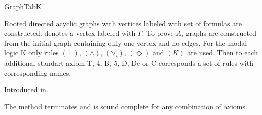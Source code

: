 \begin{entry}{GraphTabK}
\begin{clarifications}
  Rooted directed acyclic graphs with vertices labeled with set of formulas are constructed.
   denotes a vertex labeled with $\Gamma$.
  To prove $A$, graphs are constructed from the initial graph containing only one vertex
   and no edges.
  For the modal logic K only rules $(\bot)$, $(\mathord\wedge)$, $(\mathord\vee_i)$, $(\Diamond)$ and
  $(K)$ are used.
  Then to each additional standart axiom T, 4, B, 5, D, De or C corresponds a set of rules with
  corresponding names.
%
\end{clarifications}

\begin{history}
  Introduced in\cite{castilho-farinas-gasquet-herzig.1997}.
\end{history}

\begin{technicalities}
  The method terminates and is sound complete for any combination of axioms.
\end{technicalities}



\end{entry}

